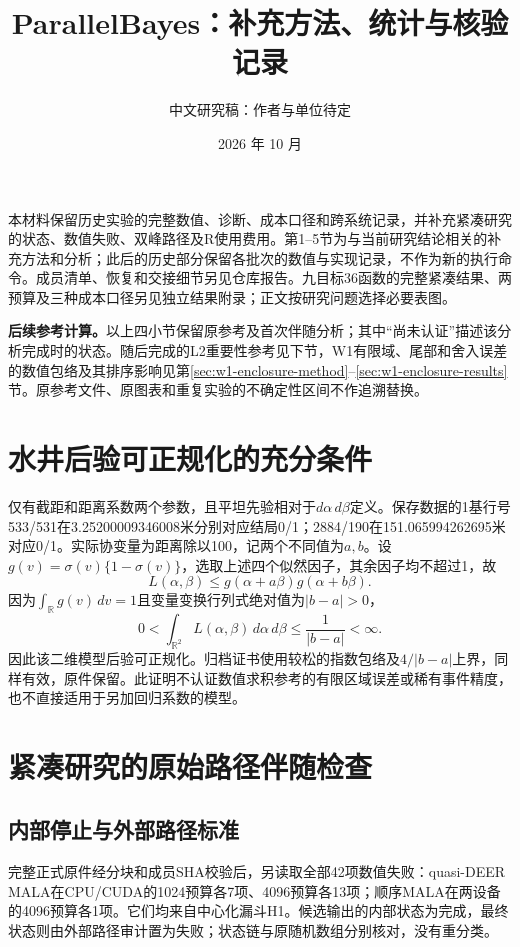 \documentclass[UTF8,fontset=fandol,zihao=-4]{ctexart}
\title{ParallelBayes：补充方法、统计与核验记录}
\author{中文研究稿：作者与单位待定}
\date{2026 年 10 月}
\begin{document}
\maketitle
\noindent 本材料保留历史实验的完整数值、诊断、成本口径和跨系统记录，并补充紧凑研究的状态、数值失败、双峰路径及R使用费用。第1--5节为与当前研究结论相关的补充方法和分析；此后的历史部分保留各批次的数值与实现记录，不作为新的执行命令。成员清单、恢复和交接细节另见仓库报告。九目标36函数的完整紧凑结果、两预算及三种成本口径另见独立结果附录；正文按研究问题选择必要表图。
\setcounter{tocdepth}{1}\tableofcontents
\clearpage



\noindent\textbf{后续参考计算。}以上四小节保留原参考及首次伴随分析；其中“尚未认证”描述该分析完成时的状态。随后完成的L2重要性参考见下节，W1有限域、尾部和舍入误差的数值包络及其排序影响见第\ref{sec:w1-enclosure-method}--\ref{sec:w1-enclosure-results}节。原参考文件、原图表和重复实验的不确定性区间不作追溯替换。





\section{水井后验可正规化的充分条件}
仅有截距和距离系数两个参数，且平坦先验相对于$d\alpha\,d\beta$定义。保存数据的1基行号533/531在3.25200009346008米分别对应结局0/1；2884/190在151.065994262695米对应0/1。实际协变量为距离除以100，记两个不同值为$a,b$。设$g(v)=\sigma(v)\{1-\sigma(v)\}$，选取上述四个似然因子，其余因子均不超过1，故
\[
L(\alpha,\beta)\leq g(\alpha+a\beta)g(\alpha+b\beta).
\]
因为$\int_{\mathbb R}g(v)\,dv=1$且变量变换行列式绝对值为$|b-a|>0$，
\[
0<\int_{\mathbb R^2}L(\alpha,\beta)\,d\alpha\,d\beta
\leq\frac{1}{|b-a|}<\infty.
\]
因此该二维模型后验可正规化。归档证书使用较松的指数包络及$4/|b-a|$上界，同样有效，原件保留。此证明不认证数值求积参考的有限区域误差或稀有事件精度，也不直接适用于另加回归系数的模型。

\section{紧凑研究的原始路径伴随检查}
\subsection{内部停止与外部路径标准}
完整正式原件经分块和成员SHA校验后，另读取全部42项数值失败：quasi-DEER MALA在CPU/CUDA的1024预算各7项、4096预算各13项；顺序MALA在两设备的4096预算各1项。它们均来自中心化漏斗H1。候选输出的内部状态为完成，最终状态则由外部路径审计置为失败；状态链与原随机数组分别核对，没有重分类。
\end{document}
